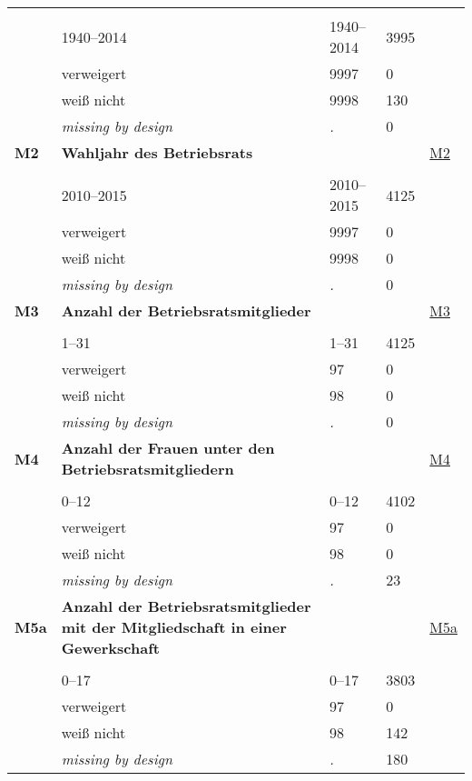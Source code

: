 \begin{longtable}{| L{2.65cm} | L{8cm} | C{1.5cm} | R{1.25cm} | C{2.25cm}  |}
   &  &  &  &  \\ 
   & 1940--2014 & 1940--2014 & 3995 &  \\ 
   & verweigert & 9997 & 0 &  \\ 
   & weiß nicht & 9998 & 130 &  \\ 
   & \textit{missing by design} & \textit{.} & 0 &  \\ 
   \midrule
\textbf{M2}\label{var:M2} & \textbf{Wahljahr des Betriebsrats} &  &  & \hyperref[M2]{M2} \\ 
   &  &  &  &  \\ 
   & 2010--2015 & 2010--2015 & 4125 &  \\ 
   & verweigert & 9997 & 0 &  \\ 
   & weiß nicht & 9998 & 0 &  \\ 
   & \textit{missing by design} & \textit{.} & 0 &  \\ 
   \midrule
\textbf{M3}\label{var:M3} & \textbf{Anzahl der Betriebsratsmitglieder} &  &  & \hyperref[M3]{M3} \\ 
   &  &  &  &  \\ 
   & 1--31 & 1--31 & 4125 &  \\ 
   & verweigert & 97 & 0 &  \\ 
   & weiß nicht & 98 & 0 &  \\ 
   & \textit{missing by design} & \textit{.} & 0 &  \\ 
   \midrule
\textbf{M4}\label{var:M4} & \textbf{Anzahl der Frauen unter den Betriebsratsmitgliedern} &  &  & \hyperref[M4]{M4} \\ 
   &  &  &  &  \\ 
   & 0--12 & 0--12 & 4102 &  \\ 
   & verweigert & 97 & 0 &  \\ 
   & weiß nicht & 98 & 0 &  \\ 
   & \textit{missing by design} & \textit{.} & 23 &  \\ 
   \midrule
\textbf{M5a}\label{var:M5a} & \textbf{Anzahl der Betriebsratsmitglieder mit der Mitgliedschaft in einer Gewerkschaft} &  &  & \hyperref[M5a]{M5a} \\ 
   &  &  &  &  \\ 
   & 0--17 & 0--17 & 3803 &  \\ 
   & verweigert & 97 & 0 &  \\ 
   & weiß nicht & 98 & 142 &  \\ 
   & \textit{missing by design} & \textit{.} & 180 &  \\ 

\end{longtable}
